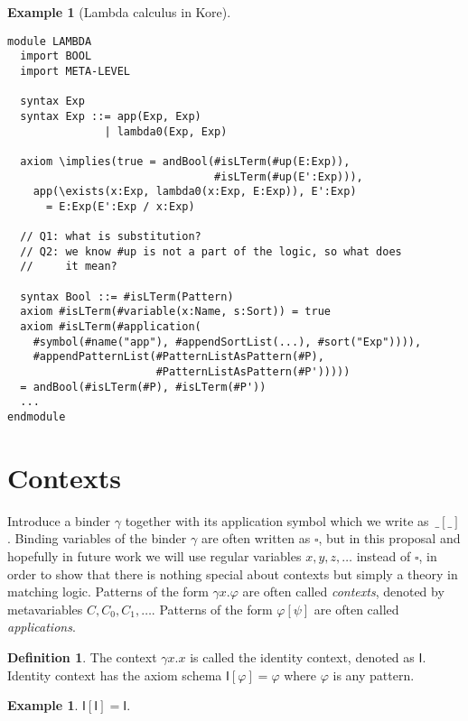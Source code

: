 \documentclass[UTF8]{article}
\newcounter{thmcounter}
\theoremstyle{plain}
\theoremstyle{definition}
\newtheorem{definition}[thmcounter]{Definition}
\newtheorem{example}[thmcounter]{Example}
\theoremstyle{remark}
\newcommand{\I}{\mathsf{I}}
\begin{document}
\begin{example}[Lambda calculus in Kore]
\quad
\begin{Verbatim}[fontsize=\small]
module LAMBDA
  import BOOL
  import META-LEVEL
  
  syntax Exp
  syntax Exp ::= app(Exp, Exp)
               | lambda0(Exp, Exp)
  
  axiom \implies(true = andBool(#isLTerm(#up(E:Exp)),
                                #isLTerm(#up(E':Exp))), 
    app(\exists(x:Exp, lambda0(x:Exp, E:Exp)), E':Exp)
      = E:Exp(E':Exp / x:Exp)
  
  // Q1: what is substitution?
  // Q2: we know #up is not a part of the logic, so what does
  //     it mean?
  
  syntax Bool ::= #isLTerm(Pattern)
  axiom #isLTerm(#variable(x:Name, s:Sort)) = true
  axiom #isLTerm(#application(
    #symbol(#name("app"), #appendSortList(...), #sort("Exp")))),
    #appendPatternList(#PatternListAsPattern(#P),
                       #PatternListAsPattern(#P')))))
  = andBool(#isLTerm(#P), #isLTerm(#P'))
  ...
endmodule
\end{Verbatim}
\end{example}


\section{Contexts}

Introduce a binder $\gamma$ together with its application symbol which we write as~$\_[\_]$. Binding variables of the binder $\gamma$ are often written as $\square$, but in this proposal and hopefully in future work we will use regular variables $x, y, z, \dots$ instead of $\square$, in order to show that there is nothing special about contexts but simply a theory in matching logic. Patterns of the form $\gamma x . \varphi$ are often called \emph{contexts}, denoted by metavariables $C, C_0, C_1, \dots$. Patterns of the form $\varphi[\psi]$ are often called \emph{applications}. 
\begin{definition}
	The context $\gamma x . x$ is called the identity context, denoted as $\I$. Identity context has the axiom schema $\I[\varphi]=\varphi$ where $\varphi$ is any pattern.
\end{definition}

\begin{example}
	$\I[\I] = \I$.
\end{example}
\end{document}
